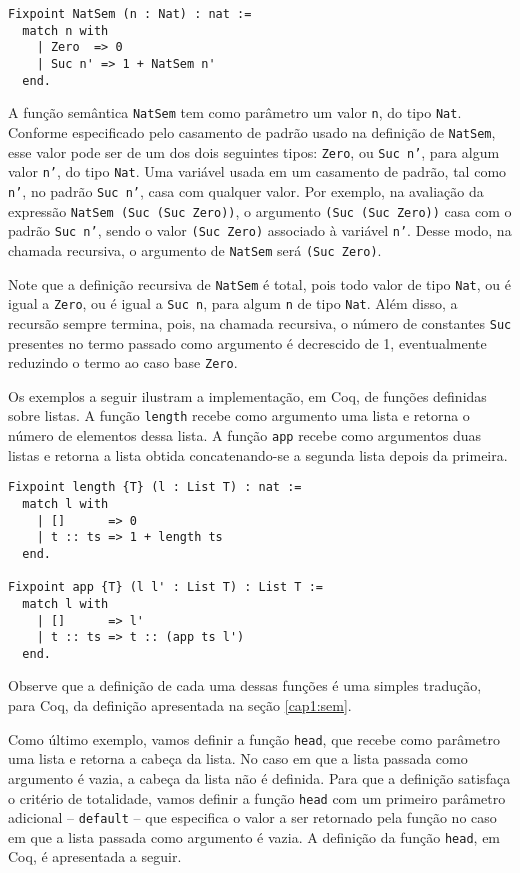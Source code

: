 \begin{lstlisting}
Fixpoint NatSem (n : Nat) : nat :=
  match n with
    | Zero  => 0
    | Suc n' => 1 + NatSem n'
  end.
\end{lstlisting}

A função semântica \texttt{NatSem} tem como parâmetro um valor \texttt{n}, do tipo \texttt{Nat}. Conforme especificado pelo casamento de padrão usado na definição de \texttt{NatSem}, esse valor pode ser de um dos dois seguintes tipos: \texttt{Zero}, ou \texttt{Suc n'}, para algum valor \texttt{n'}, do tipo \texttt{Nat}. Uma variável usada em um casamento de padrão, tal como \texttt{n'}, no padrão \texttt{Suc n'}, casa com qualquer valor. Por exemplo, na avaliação da expressão \texttt{NatSem (Suc (Suc Zero))}, o argumento \texttt{(Suc (Suc Zero))} casa com o padrão \texttt{Suc n'}, sendo o valor \texttt{(Suc Zero)} associado à variável \texttt{n'}. Desse modo, na chamada recursiva, o argumento de \texttt{NatSem} será \texttt{(Suc Zero)}. 

Note que a definição recursiva de \texttt{NatSem} \'e total, pois todo valor de tipo \texttt{Nat}, ou \'e igual a \texttt{Zero}, ou é igual a \texttt{Suc n}, para algum \texttt{n} de tipo \texttt{Nat}. Além disso, a recursão sempre termina, pois, na chamada recursiva, o  n\'umero de constantes \texttt{Suc} presentes no termo passado como argumento é decrescido de 1, eventualmente reduzindo o termo ao caso base \texttt{Zero}.

Os exemplos a seguir ilustram a implementação, em Coq, de funções definidas sobre listas. A função \texttt{length} recebe como argumento uma lista e retorna o número de elementos dessa lista. A função \texttt{app} recebe como argumentos duas listas e retorna a lista obtida concatenando-se a segunda lista depois da primeira. 

\begin{lstlisting}
Fixpoint length {T} (l : List T) : nat :=
  match l with
    | []      => 0
    | t :: ts => 1 + length ts
  end.

Fixpoint app {T} (l l' : List T) : List T :=
  match l with
    | []      => l'
    | t :: ts => t :: (app ts l')
  end.
\end{lstlisting}

Observe que a defini\c{c}\~ao de cada uma dessas fun\c{c}\~oes é uma simples 
tradu\c{c}\~ao, para Coq, da definição apresentada na se\c{c}\~ao \ref{cap1:sem}.

Como último exemplo, vamos definir a função \texttt{head}, que recebe como parâmetro uma lista e retorna a cabeça da lista. No caso em que a lista passada como argumento é vazia, a cabeça da lista não é definida. Para que a definição satisfaça o critério de totalidade, vamos definir a função \texttt{head} com um primeiro parâmetro adicional -- \texttt{default} -- que especifica o valor a ser retornado pela função no caso em que a lista passada como argumento é vazia. A definição da função \texttt{head}, em Coq, é apresentada a seguir.

